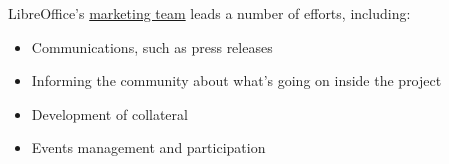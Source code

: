 \begin{kaobox}[frametitle=Marketing efforts of LibreOffice]

LibreOffice's \href{https://www.libreoffice.org/community/marketing/}{marketing team} leads a number of efforts, including:

\begin{itemize}

\item Communications, such as press releases

\item Informing the community about what's going on inside the project

\item Development of collateral

\item Events management and participation




\end{itemize}

\end{kaobox}

